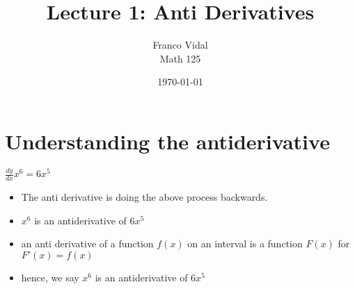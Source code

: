 \documentclass{article}
\title{Lecture 1: Anti Derivatives}
\author{Franco Vidal \\ Math 125}
\date{\today}
\begin{document}
\maketitle
\maketitle
\section*{Understanding the antiderivative}
\begin{center}
$\frac{dy}{dx} x^6 = 6x^5$
\end{center}
\begin{itemize}
\item The anti derivative is doing the above process backwards.
\item $x^6$ is an antiderivative of $6x^5$
\item an anti derivative of a function $f(x)$ on an interval is a function $F(x)$ for $F'(x) = f(x)$
\item hence, we say $x^6$ is an antiderivative of $6x^5$
\end{itemize}
\end{document}
